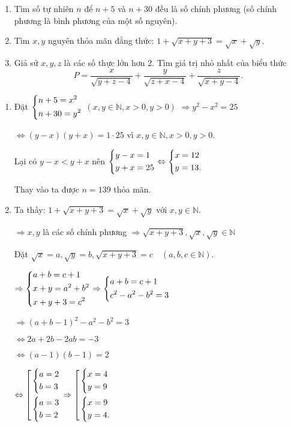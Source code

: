 \begin{ex}%
\hfill
    \begin{enumerate}    
        \item Tìm số tự nhiên $n$ để $n+5$ và $n+30$ đều là số chính phương (số chính phương là bình phương của một số nguyên).
\item Tìm $x,y$ nguyên thỏa mãn đẳng thức: $1+\sqrt{x+y+3}=\sqrt{x}+\sqrt{y}.$
\item Giả sử $x,y,z$ là các số thực lớn hơn 2. Tìm giá trị nhỏ nhất của biểu thức
$$P=\dfrac{x}{\sqrt{y+z-4}}+\dfrac{y}{\sqrt{z+x-4}}+\dfrac{z}{\sqrt{x+y-4}}.$$ 
    \end{enumerate}
\loigiai
    {
    \begin{enumerate}
       \item Đặt $\left\{\begin{aligned}&n+5=x^2\\&n+30=y^2\end{aligned}\right.$ \hspace{1cm} $(x,y\in \mathbb{N},x>0,y>0)$
$\Rightarrow y^2-x^2=25$

$\Leftrightarrow (y-x)(y+x)=1\cdot 25$ vì $x,y\in \mathbb{N},x>0,y>0.$

Lại có $y-x<y+x$ nên $\left\{\begin{aligned}&y-x=1\\&y+x=25\end{aligned}\right. \Leftrightarrow \left\{\begin{aligned}&x=12\\&y=13.\end{aligned}\right.$

Thay vào ta được $n=139$ thỏa mãn.

\item Ta thấy:  $1+\sqrt{x+y+3}=\sqrt{x}+\sqrt{y}$ với $x,y\in \mathbb{N}.$ 

$\Rightarrow x,y$ là các số chính phương $\Rightarrow \sqrt{x+y+3},\sqrt{x},\sqrt{y}\in \mathbb{N}$

Đặt  $\sqrt{x}=a,\sqrt{y}=b,\sqrt{x+y+3}=c \quad (a,b,c\in \mathbb{N}).$

$\Rightarrow \left\{\begin{aligned}&a+b=c+1\\&x+y=a^2+b^2\\&x+y+3=c^2\end{aligned}\right. \Rightarrow \left\{\begin{aligned}&a+b=c+1\\&c^2-a^2-b^2=3\end{aligned}\right.$

$\Rightarrow (a+b-1)^2-a^2-b^2=3$

$\Leftrightarrow 2a+2b-2ab=-3$

$\Leftrightarrow (a-1)(b-1)=2$

$\Leftrightarrow \left[\begin{aligned}&\left\{\begin{aligned}&a=2\\&b=3\end{aligned}\right.\\&\left\{\begin{aligned}&a=3\\&b=2\end{aligned}\right.\end{aligned}\right.  \Rightarrow\left[\begin{aligned}&\left\{\begin{aligned}&x=4\\&y=9\end{aligned}\right.\\&\left\{\begin{aligned}&x=9\\&y=4.\end{aligned}\right.\end{aligned}\right. $


\end{enumerate}}
\end{ex}
